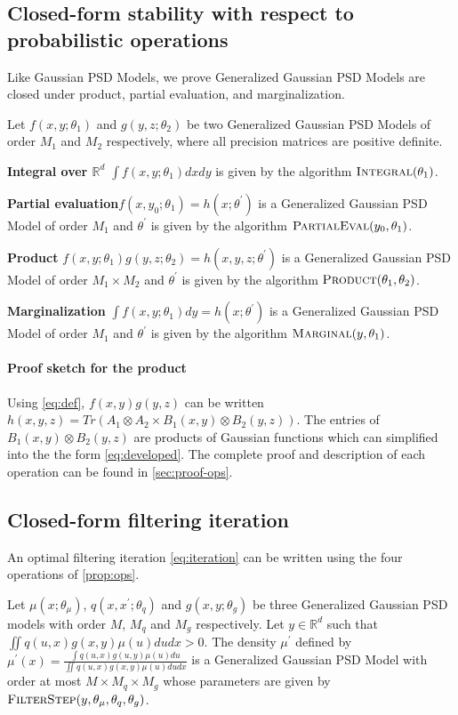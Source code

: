 \subsection{Closed-form stability with respect to probabilistic operations}
Like Gaussian PSD Models, we prove Generalized Gaussian PSD Models are closed under product, partial evaluation, and marginalization.
\begin{proposition}\label{prop:ops}
    Let $f(x, y; \theta_1)$ and $g(y, z; \theta_2)$ be two Generalized Gaussian PSD Models of order $M_1$ and $M_2$ respectively, where all precision matrices are positive definite.
    \begin{enumthm}
        \item \textbf{Integral over $\mathbb R^d$} $\int f(x, y; \theta_1)dxdy$ is given by the algorithm $\operatorname{\textsc{Integral}}(\theta_1)$.
        \item \textbf{Partial evaluation}$f(x, y_0; \theta_1) = h(x; \theta^\prime)$ is a Generalized Gaussian PSD Model of order $M_1$ and $\theta^\prime$ is given by the algorithm $\operatorname{\textsc{PartialEval}}(y_0, \theta_1)$.
        \item \textbf{Product} $f(x, y; \theta_1)g(y, z; \theta_2)=h(x, y, z; \theta^\prime)$ is a Generalized Gaussian PSD Model of order $M_1\times M_2$ and $\theta^\prime$ is given by the algorithm $\operatorname{\textsc{Product}}(\theta_1, \theta_2)$.
        \item \textbf{Marginalization} $\int f(x, y; \theta_1)dy=h(x; \theta^\prime)$ is a Generalized Gaussian PSD Model of order $M_1$ and $\theta^\prime$ is given by the algorithm $\operatorname{\textsc{Marginal}}(y, \theta_1)$.
    \end{enumthm}
    \end{proposition}
\paragraph{Proof sketch for the product} Using \cref{eq:def}, $f(x, y)g(y, z)$ can be written $h(x, y, z) = Tr(A_1\otimes A_2 \times B_1(x, y) \otimes B_2(y, z))$. The entries of $B_1(x, y) \otimes B_2(y, z)$ are products of Gaussian functions which can simplified into the the form \cref{eq:developed}. The complete proof and description of each operation can be found in \cref{sec:proof-ops}.

\subsection{Closed-form filtering iteration}
An optimal filtering iteration \cref{eq:iteration} can be written using the four operations of \cref{prop:ops}.
\begin{proposition}\label{proposition:psdfilterstep}
Let $\mu(x; \theta_\mu)$, $q(x, x^\prime; \theta_q)$ and $g(x, y; \theta_g)$ be three Generalized Gaussian PSD models with order $M$, $M_q$ and $M_g$ respectively. Let $y\in\mathbb R^d$ such that $\iint q(u, x)g(x, y)\mu(u)dudx>0$. The density $\mu^\prime$ defined by $\mu^\prime(x) = \frac{\int q(u, x)g(u, y)\mu(u)du}{\iint q(u, x)g(x, y)\mu(u)dudx}$ is a Generalized Gaussian PSD Model with order at most $M \times M_q \times M_g$ whose parameters are given by $\operatorname{\textsc{FilterStep}}(y, \theta_\mu, \theta_q, \theta_g)$.
\end{proposition}

